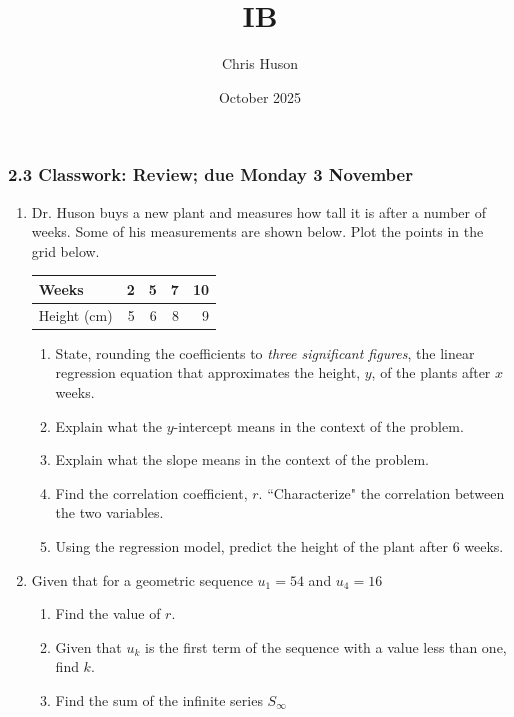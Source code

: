 \documentclass[12pt, twoside]{article}
\title{IB}
\author{Chris Huson}
\date{October 2025}
\begin{document}
\subsubsection*{2.3 Classwork: Review; due Monday 3 November}
\begin{enumerate}[itemsep=0.25cm]

    \item Dr. Huson buys a new plant and measures how tall it is after a number of weeks. Some of his measurements are shown below. Plot the points in the grid below.
  \renewcommand{\arraystretch}{1.6}
    \begin{center}
      \begin{tabular}{|l|r|r|r|r|}
      \hline
      Weeks & 2 & 5 & 7 & 10\\
      \hline
      Height (cm) & 5 & 6 & 8 & 9 \\
      \hline
      \end{tabular}
    \end{center}

\begin{center} %
\end{center}
\begin{enumerate}[itemsep=1cm]
    \item State, rounding the coefficients to \emph{three significant figures}, the linear regression equation that approximates the height, $y$, of the plants after $x$ weeks.
    \item Explain what the $y$-intercept means in the context of the problem.
    \item Explain what the slope means in the context of the problem.
    \item Find the correlation coefficient, $r$. ``Characterize" the correlation between the two variables.
    \item Using the regression model, predict the height of the plant after 6 weeks.
\end{enumerate}

\newpage
\item Given that for a geometric sequence $u_1=54$ and $u_4=16$
\begin{enumerate}
    \item Find the value of $r$.
    \item Given that $u_k$ is the first term of the sequence with a value less than one, find $k$.
    \item Find the sum of the infinite series $S_\infty$
\end{enumerate}


\end{enumerate}
\end{document}
